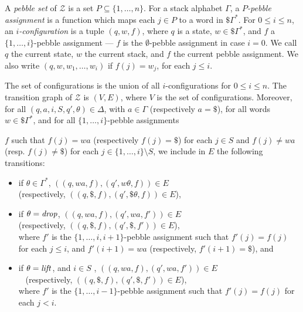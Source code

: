 \documentclass[a4paper,UKenglish,cleveref, autoref, thm-restate]{lipics-v2021}
\begin{document}
A {\em pebble set} of $\mathcal{Z}$ is a set $P \subseteq \{ 1, \ldots, n\}$. For a stack alphabet $\Gamma$, a 
{\em $P$-pebble assignment} is a function which maps each $j \in P$ to a word in $\$\Gamma^*$.
For $0 \leq i \leq n$, an {\em $i$-configuration} is a tuple $(q, w, f )$, where 
$q$ is a state,
$w \in \$\Gamma^*$, and
$f$ a $\{ 1, \ldots , i \}$-pebble assignment \---- $f$ is the $\emptyset$-pebble assignment in case $i=0$. 
We call  $q$ the current state, $w$ the current stack, and
$f$ the current pebble assignment. 
We also write $(q,w, w_{1} , \ldots , w_{i} )$ if 
$f(j) = w_j$, for each
$j \leq i$.


The set of configurations is the union of all $i$-configurations for $0 \leq i \leq n$. The transition graph of $\mathcal{Z}$ is $(V,E)$, where $V$ is the set of configurations. %
Moreover, 
for all $(q, a, i, S, q', \theta) \in \Delta$, with $a \in \Gamma$ (respectively $ \! a = \$ $),
 for all words $w \in \$ \Gamma^*$, and for all $\{ 1, \ldots , i \}$-pebble assignments 
 
 \begin{samepage}
\noindent
 $f$ such that $f(j) = wa$ (respectively $f(j)= \$ $) for each
$j \in S$ 	and
 $f(j) \neq wa$ (resp. $f(j) \neq \$ $) for each $j \in \{ 1, \ldots , i \} \setminus S$,
we include in $E$ the following transitions:
\begin{itemize}
\item if $\theta \in \Gamma^*$, 
$((q,wa,f), (q',w\theta, f)) \in E $ \\
(respectively, $((q,\$,f), (q',\$\theta, f)) \in E $),
\item if $ \theta = \text{\textit{drop}}$, 
$((q,wa,f), (q',wa, f')) \in E $  \\
(respectively, $((q,\$,f), (q',\$, f')) \in E $),\\
where $f'$ is the $\{ 1, \ldots , i, i+1 \}$-pebble assignment such that
$f'(j) = f(j)$ for each
$j \leq i$, and $f'(i+1) = wa$ (respectively, $f'(i+1) = \$$), and
\item if $\theta = \text{\textit{lift}}$, and $ i \in S $%
, 
$((q,wa,f), (q',wa, f')) \in E $ \\ 
(respectively, $((q,\$,f), (q',\$, f')) \in E $),\\
where $f'$ is the $\{ 1, \ldots , i - 1 \}$-pebble assignment such that
$f'(j) = f(j)$ for each
$j < i$.
\end{itemize}
\end{samepage}
\end{document}
